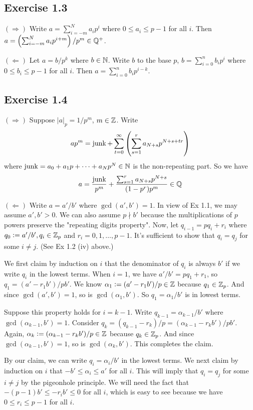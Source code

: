 \documentclass[../Koblitz.tex]{subfiles}
\begin{document}
\subsection*{Exercise 1.3}

$(\Rightarrow)$ Write $a=\sum_{i=-m}^N a_ip^i$ where $0\leq a_i\leq p-1$ for all $i$. Then $a=\left(\sum_{i=-m}^N a_ip^{i+m}\right)/p^m\in\mathbb{Q}^+$.

$(\Leftarrow)$ Let $a=b/p^k$ where $b\in\mathbb{N}$. Write $b$ to the base $p$, $b=\sum_{i=0}^n b_ip^i$ where $0\leq b_i\leq p-1$ for all $i$. Then $a=\sum_{i=0}^n b_ip^{i-k}$.

\subsection*{Exercise 1.4}

$(\Rightarrow)$ Suppose $|a|_p=1/p^m$, $m\in\mathbb{Z}$. Write $$ap^m=\operatorname{junk}+\sum_{t=0}^\infty \left(\sum_{s=1}^r a_{N+s}p^{N+s+tr}\right)$$ where $\operatorname{junk}=a_0+a_1p+\cdots+a_Np^N\in\mathbb{N}$ is the non-repeating part. So we have $$a = \frac{\operatorname{junk}}{p^m}+\frac{\sum_{s=1}^r a_{N+s}p^{N+s}}{(1-p^r)p^m}\in\mathbb{Q}$$

$(\Leftarrow)$ Write $a=a'/b'$ where $\gcd(a',b')=1$. In view of Ex 1.1, we may assume $a',b'>0$. We can also assume $p\nmid b'$ because the multiplications of $p$ powers preserve the "repeating digits property". Now, let $q_{i-1}=pq_i+r_i$ where $q_0:=a'/b',q_i\in\mathbb{Z}_p$ and $r_i=0,1,\ldots,p-1$. It's sufficient to show that $q_i=q_j$ for some $i\neq j$.  (See Ex 1.2 (iv) above.)

We first claim by induction on $i$ that the denominator of $q_i$ is always $b'$ if we write $q_i$ in the lowest terms. When $i=1$, we have $a'/b'=pq_1+r_1$, so $q_1=(a'-r_1b')/pb'$. We know $\alpha_1:=(a'-r_1b')/p\in\mathbb{Z}$ because $q_1\in\mathbb{Z}_p$. And since $\gcd(a',b')=1$, so is $\gcd(\alpha_1,b')$. So $q_1=\alpha_1/b'$ is in lowest terms.

Suppose this property holds for $i=k-1$. Write $q_{k-1}=\alpha_{k-1}/b'$ where $\gcd(\alpha_{k-1},b')=1$. Consider $q_k=(q_{k-1}-r_k)/p=(\alpha_{k-1}-r_kb')/pb'$. Again, $\alpha_k:=(\alpha_{k-1}-r_kb')/p\in\mathbb{Z}$ because $q_k\in\mathbb{Z}_p$. And since $\gcd(\alpha_{k-1},b')=1$, so is $\gcd(\alpha_k,b')$. This completes the claim.

By our claim, we can write $q_i=\alpha_i/b'$ in the lowest terms. We next claim by induction on $i$ that $-b'\leq \alpha_i\leq a'$ for all $i$. This will imply that $q_i=q_j$ for some $i\neq j$ by the pigeonhole principle. We will need the fact that $-(p-1)b'\leq-r_ib'\leq 0$ for all $i$, which is easy to see because we have $0\leq r_i\leq p-1$ for all $i$.
\end{document}
